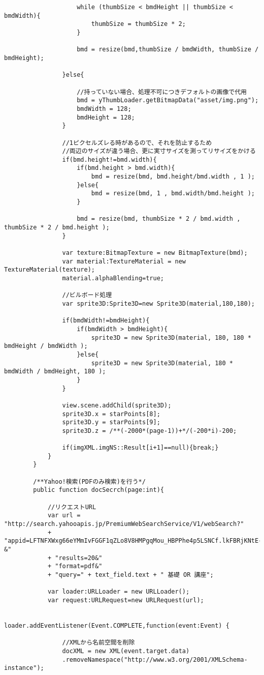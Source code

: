 {\begin{verbatim}
					while (thumbSize < bmdHeight || thumbSize < bmdWidth){
						thumbSize = thumbSize * 2;
					}
					
					bmd = resize(bmd,thumbSize / bmdWidth, thumbSize / bmdHeight);
					
				}else{
					
					//持っていない場合、処理不可につきデフォルトの画像で代用
					bmd = yThumbLoader.getBitmapData("asset/img.png");
					bmdWidth = 128;
					bmdHeight = 128;
				}
				
				//1ピクセルズレる時があるので、それを防止するため
				//両辺のサイズが違う場合、更に実寸サイズを測ってリサイズをかける
				if(bmd.height!=bmd.width){
					if(bmd.height > bmd.width){
						bmd = resize(bmd, bmd.height/bmd.width , 1 );
					}else{
						bmd = resize(bmd, 1 , bmd.width/bmd.height );
					}
				
					bmd = resize(bmd, thumbSize * 2 / bmd.width , thumbSize * 2 / bmd.height );
				}
				
				var texture:BitmapTexture = new BitmapTexture(bmd);
				var material:TextureMaterial = new TextureMaterial(texture);
				material.alphaBlending=true;
				
				//ビルボード処理
				var sprite3D:Sprite3D=new Sprite3D(material,180,180);
				
				if(bmdWidth!=bmdHeight){
					if(bmdWidth > bmdHeight){
						sprite3D = new Sprite3D(material, 180, 180 * bmdHeight / bmdWidth ); 
					}else{
						sprite3D = new Sprite3D(material, 180 * bmdWidth / bmdHeight, 180 ); 
					}
				}
				
				view.scene.addChild(sprite3D);
				sprite3D.x = starPoints[8];
				sprite3D.y = starPoints[9];
				sprite3D.z = /**(-2000*(page-1))+*/(-200*i)-200;
				
				if(imgXML.imgNS::Result[i+1]==null){break;}
			}
		}
		
		/**Yahoo!検索(PDFのみ検索)を行う*/
		public function docSecrch(page:int){
			
			//リクエストURL
			var url = "http://search.yahooapis.jp/PremiumWebSearchService/V1/webSearch?"
			+ "appid=LFTNFXWxg66eYMmIvFGGF1qZLo8V8HMPgqMou_HBPPhe4p5LSNCf.lkFBRjKNtE-&"
			+ "results=20&"
			+ "format=pdf&"
			+ "query=" + text_field.text + " 基礎 OR 講座";
			
			var loader:URLLoader = new URLLoader();
			var request:URLRequest=new URLRequest(url);
			
			loader.addEventListener(Event.COMPLETE,function(event:Event) {
									
				//XMLから名前空間を削除
				docXML = new XML(event.target.data)
				.removeNamespace("http://www.w3.org/2001/XMLSchema-instance");
				

\end{verbatim}}
